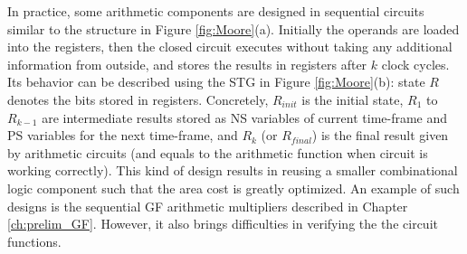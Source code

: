 \begin{figure}[bp]
\end{figure}

In practice,
some arithmetic components are designed in sequential circuits similar to the structure in 
Figure \ref{fig:Moore}(a). Initially the operands are loaded into the registers, 
then the closed circuit executes without taking any additional information from outside,
and stores the results in registers after $k$ clock cycles. Its behavior can be described using the 
STG in Figure \ref{fig:Moore}(b): state $R$ denotes the bits stored in registers. Concretely, 
$R_{init}$ is the initial state, $R_1$ to $R_{k-1}$ are intermediate results stored as NS variables 
of current time-frame and PS variables for the next time-frame, and $R_k$ (or $R_{final}$) 
is the final result given by arithmetic circuits (and equals to the
arithmetic function when circuit is working correctly).
This kind of design results in 
reusing a smaller combinational logic component such that the area cost is greatly optimized.
An example of such designs is the sequential GF arithmetic multipliers described in Chapter \ref{ch:prelim_GF}.
However, it also brings difficulties in verifying the the circuit functions.

\begin{figure}[bp]
\end{figure}

